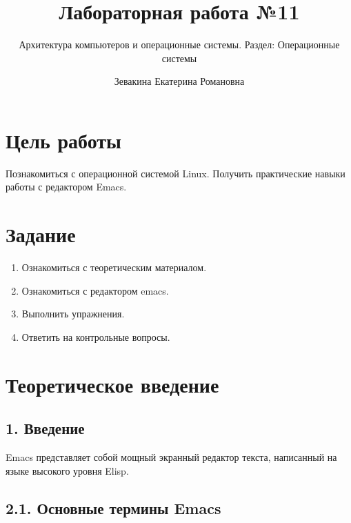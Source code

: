 \documentclass[
  english,
  russian,
  12pt,
  a4paper,
]{scrreprt}
\title{Лабораторная работа №11}
\subtitle{Архитектура компьютеров и операционные системы. Раздел:
Операционные системы}
\author{Зевакина Екатерина Романовна}
\date{}
\providecommand{\tightlist}{%
  \setlength{\itemsep}{0pt}\setlength{\parskip}{0pt}}
\begin{document}
\maketitle

\renewcommand*\contentsname{Содержание}
{
\setcounter{tocdepth}{2}
\tableofcontents
}
\listoffigures
\listoftables
{}
\chapter{Цель
работы}\label{ux446ux435ux43bux44c-ux440ux430ux431ux43eux442ux44b}

Познакомиться с операционной системой Linux. Получить практические
навыки работы с редактором Emacs.

\chapter{Задание}\label{ux437ux430ux434ux430ux43dux438ux435}

\begin{enumerate}
\def\labelenumi{\arabic{enumi}.}
\tightlist
\item
  Ознакомиться с теоретическим материалом.
\item
  Ознакомиться с редактором emacs.
\item
  Выполнить упражнения.
\item
  Ответить на контрольные вопросы.
\end{enumerate}

\chapter{Теоретическое
введение}\label{ux442ux435ux43eux440ux435ux442ux438ux447ux435ux441ux43aux43eux435-ux432ux432ux435ux434ux435ux43dux438ux435}

\section{1. Введение}\label{ux432ux432ux435ux434ux435ux43dux438ux435}

Emacs представляет собой мощный экранный редактор текста, написанный на
языке высокого уровня Elisp.

\section{2.1. Основные термины
Emacs}\label{ux43eux441ux43dux43eux432ux43dux44bux435-ux442ux435ux440ux43cux438ux43dux44b-emacs}
\end{document}
